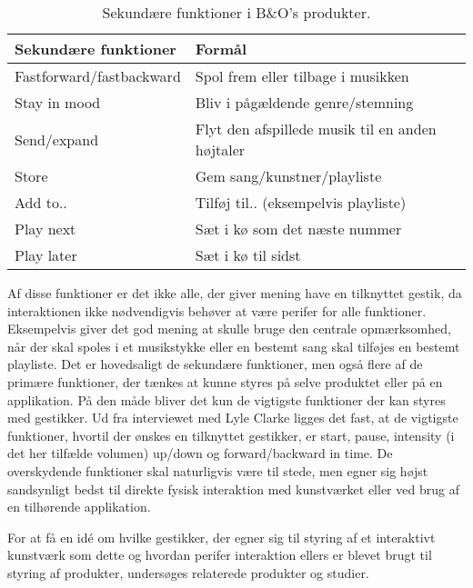 %
\begin{table}[H]
	\centering
	\begin{tabular}{ | l | p{8cm} |}
		\hline
		\multicolumn{1}{|l|}{\textbf{Sekundære funktioner}} & \multicolumn{1}{l|}{\textbf{Formål}} \\ \hline
		Fastforward/fastbackward & Spol frem eller tilbage i musikken \\ \hline
		Stay in mood & Bliv i pågældende genre/stemning \\ \hline
		Send/expand & Flyt den afspillede musik til en anden højtaler \\ \hline
		Store & Gem sang/kunstner/playliste \\ \hline
		Add to.. & Tilføj til.. (eksempelvis playliste) \\ \hline
		Play next & Sæt i kø som det næste nummer \\ \hline
		Play later & Sæt i kø til sidst \\ \hline
	\end{tabular}
	\caption{Sekundære funktioner i B$\&$O's produkter.}
	\label{tab:BogOsSekundaereFunktioner}
\end{table}
\noindent
%

Af disse funktioner er det ikke alle, der giver mening have en tilknyttet gestik, da interaktionen ikke nødvendigvis behøver at være perifer for alle funktioner. Eksempelvis giver det god mening at skulle bruge den centrale opmærksomhed, når der skal spoles i et musikstykke eller en bestemt sang skal tilføjes en bestemt playliste. Det er hovedsaligt de sekundære funktioner, men også flere af de primære funktioner, der tænkes at kunne styres på selve produktet eller på en applikation. På den måde bliver det kun de vigtigste funktioner der kan styres med gestikker. Ud fra interviewet med Lyle Clarke ligges det fast, at de vigtigste funktioner, hvortil der ønskes en tilknyttet gestikker, er start, pause, intensity (i det her tilfælde volumen) up/down og forward/backward in time. De overskydende funktioner skal naturligvis være til stede, men egner sig højst sandsynligt bedst til direkte fysisk interaktion med kunstværket eller ved brug af en tilhørende applikation.

For at få en idé om hvilke gestikker, der egner sig til styring af et interaktivt kunstværk som dette og hvordan perifer interaktion ellers er blevet brugt til styring af produkter, undersøges relaterede produkter og studier. 




